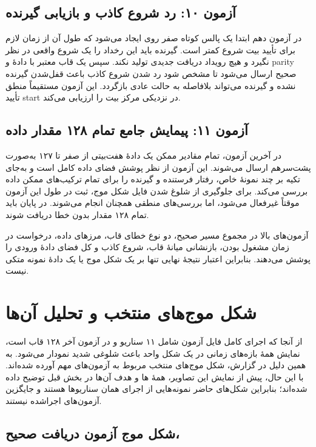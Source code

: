 \documentclass[11pt,a4paper]{article}
\newcommand{\code}[1]{\lr{\texttt{\detokenize{#1}}}}
\begin{document}
\subsection{آزمون ۱۰: رد شروع کاذب و بازیابی گیرنده}

در آزمون دهم ابتدا یک پالس کوتاه صفر روی \code{manual_rx} ایجاد می‌شود که طول آن از زمان لازم برای تأیید بیت شروع کمتر است. گیرنده باید این رخداد را یک شروع واقعی در نظر نگیرد و هیچ رویداد دریافت جدیدی تولید نکند. سپس یک قاب معتبر با دادهٔ \code{0000001} و parity صحیح ارسال می‌شود تا مشخص شود رد شدن شروع کاذب باعث قفل‌شدن گیرنده نشده و گیرنده می‌تواند بلافاصله به حالت عادی بازگردد. این آزمون مستقیماً منطق تأیید start در نزدیکی مرکز بیت را ارزیابی می‌کند.

\subsection{آزمون ۱۱: پیمایش جامع تمام ۱۲۸ مقدار داده}

در آخرین آزمون، تمام مقادیر ممکن یک دادهٔ هفت‌بیتی از صفر تا ۱۲۷ به‌صورت پشت‌سرهم ارسال می‌شوند. این آزمون از نظر پوشش فضای داده کامل است و به‌جای تکیه بر چند نمونهٔ خاص، رفتار فرستنده و گیرنده را برای تمام ترکیب‌های ممکن داده بررسی می‌کند. برای جلوگیری از شلوغ شدن فایل شکل موج، ثبت  در طول این آزمون موقتاً غیرفعال می‌شود، اما بررسی‌های منطقی همچنان انجام می‌شوند. در پایان باید تمام ۱۲۸ مقدار بدون خطا دریافت شوند.

آزمون‌های بالا در مجموع مسیر صحیح، دو نوع خطای قاب، مرزهای داده، درخواست در زمان مشغول بودن، بازنشانی میانهٔ قاب، شروع کاذب و کل فضای دادهٔ ورودی را پوشش می‌دهند. بنابراین اعتبار نتیجهٔ نهایی تنها بر یک شکل موج یا یک دادهٔ نمونه متکی نیست.

\section{شکل موج‌های منتخب و تحلیل آن‌ها}

از آنجا که اجرای کامل فایل آزمون شامل ۱۱ سناریو و در آزمون آخر ۱۲۸ قاب است، نمایش همۀ بازه‌های زمانی در یک شکل واحد باعث شلوغی شدید نمودار می‌شود. به همین دلیل در گزارش، شکل موج‌های منتخب مربوط به آزمون‌های مهم آورده شده‌اند. با این حال، پیش از نمایش این تصاویر، همۀ \code{test_id}ها و هدف آن‌ها در بخش قبل توضیح داده شده‌اند؛ بنابراین شکل‌های حاضر نمونه‌هایی از اجرای همان سناریوها هستند و جایگزین آزمون‌های اجراشده نیستند.

\subsection{شکل موج آزمون دریافت صحیح، }
\end{document}
